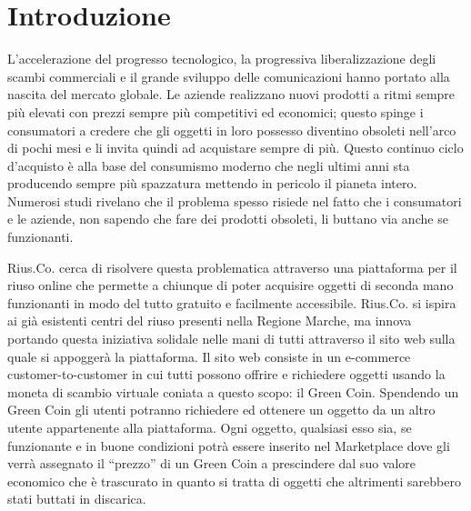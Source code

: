 \section{Introduzione}
L'accelerazione del progresso tecnologico, la progressiva liberalizzazione degli scambi commerciali e il grande sviluppo delle comunicazioni hanno portato alla nascita del mercato globale. Le aziende realizzano nuovi prodotti a ritmi sempre più elevati con prezzi sempre più competitivi ed economici; questo spinge i consumatori a credere che gli oggetti in loro possesso diventino obsoleti nell'arco di pochi mesi e li invita quindi ad acquistare sempre di più. Questo continuo ciclo d'acquisto è alla base del consumismo moderno che negli ultimi anni sta producendo sempre più spazzatura mettendo in pericolo il pianeta intero. Numerosi studi rivelano che il problema spesso risiede nel fatto che i consumatori e le aziende, non sapendo che fare dei prodotti obsoleti, li buttano via anche se funzionanti. 
\medskip

Rius.Co. cerca di risolvere questa problematica attraverso una piattaforma per il riuso online che permette a chiunque di poter acquisire oggetti di seconda mano funzionanti in modo del tutto gratuito e facilmente accessibile. Rius.Co. si ispira ai già esistenti centri del riuso presenti nella Regione Marche, ma innova portando questa iniziativa solidale nelle mani di tutti attraverso il sito web sulla quale si appoggerà la piattaforma. Il sito web consiste in un e-commerce customer-to-customer in cui tutti possono offrire e richiedere oggetti usando la moneta di scambio virtuale coniata a questo scopo: il Green Coin. Spendendo un Green Coin gli utenti potranno richiedere ed ottenere un oggetto da un altro utente appartenente alla piattaforma. Ogni oggetto, qualsiasi esso sia, se funzionante e in buone condizioni potrà essere inserito nel Marketplace dove gli verrà assegnato il “prezzo” di un Green Coin a prescindere dal suo valore economico che è trascurato in quanto si tratta di oggetti che altrimenti sarebbero stati buttati in discarica. 
\medskip

